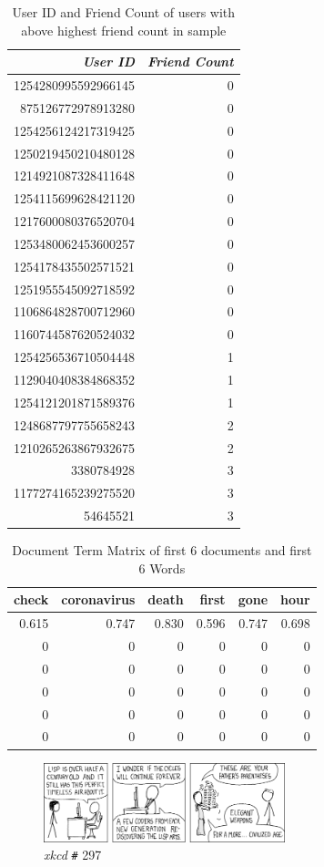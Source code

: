 \documentclass[11pt]{article}
\begin{document}
\begin{table}[htbp]
\caption{\label{tab:org235fc5f}User ID and Friend Count of users with above highest friend count in sample}
\centering
\begin{tabular}{rr}
\textbf{\emph{User ID}} & \textbf{\emph{Friend Count}}\\
\hline
1254280995592966145 & 0\\
875126772978913280 & 0\\
1254256124217319425 & 0\\
1250219450210480128 & 0\\
1214921087328411648 & 0\\
1254115699628421120 & 0\\
1217600080376520704 & 0\\
1253480062453600257 & 0\\
1254178435502571521 & 0\\
1251955545092718592 & 0\\
1106864828700712960 & 0\\
1160744587620524032 & 0\\
1254256536710504448 & 1\\
1129040408384868352 & 1\\
1254121201871589376 & 1\\
1248687797755658243 & 2\\
1210265263867932675 & 2\\
3380784928 & 3\\
1177274165239275520 & 3\\
54645521 & 3\\
\end{tabular}
\end{table}



\begin{table}[htbp]
\caption{\label{tab:org7b24c98}Document Term Matrix of first 6 documents and first 6 Words}
\centering
\begin{tabular}{rrrrrr}
\textbf{\textbf{check}} & \textbf{\textbf{coronavirus}} & \textbf{\textbf{death}} & \textbf{\textbf{first}} & \textbf{\textbf{gone}} & \textbf{\textbf{hour}}\\
\hline
0.615 & 0.747 & 0.830 & 0.596 & 0.747 & 0.698\\
0 & 0 & 0 & 0 & 0 & 0\\
0 & 0 & 0 & 0 & 0 & 0\\
0 & 0 & 0 & 0 & 0 & 0\\
0 & 0 & 0 & 0 & 0 & 0\\
0 & 0 & 0 & 0 & 0 & 0\\
\end{tabular}
\end{table}

\begin{figure}[htbp]
\centering
\includegraphics[width=7cm]{./Figures/lisp_cycles.png}
\caption{\label{fig:org3b3b543}\emph{xkcd} \texttt{\#} 297}
\end{figure}
\end{document}
